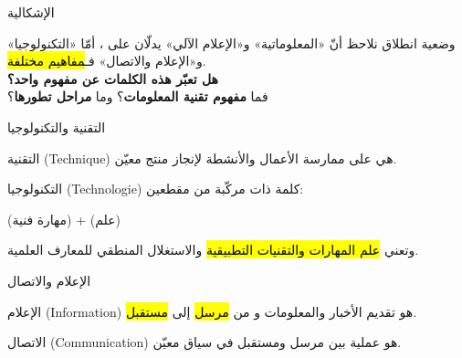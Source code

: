 \documentclass[aspectratio=169, 11pt]{beamer}
\begin{document}
\begin{frame}{الإشكالية}
  \begin{block}{وضعية انطلاق}
    نلاحظ أنّ «المعلوماتية» و«الإعلام الآلي» يدلّان على ،
    أمّا «التكنولوجيا» و«الإعلام والاتصال» فـ\hl{مفاهيم مختلفة}.\\[4pt]
    \textbf{هل تعبّر هذه الكلمات عن مفهوم واحد؟}\\[4pt]
    فما \textbf{مفهوم تقنية المعلومات}؟ وما \textbf{مراحل تطورها}؟
  \end{block}
\end{frame}


\begin{frame}{التقنية والتكنولوجيا}
  \begin{block}{التقنية (Technique)}
    هي  على ممارسة الأعمال والأنشطة لإنجاز منتج معيّن.
  \end{block}
  \begin{block}{التكنولوجيا (Technologie)}
    كلمة ذات  مركّبة من مقطعين:
    \centerline{ (مهارة فنية) \;+\;  (علم)}
    وتعني \hl{علم المهارات والتقنيات التطبيقية} والاستغلال المنطقي للمعارف العلمية.
  \end{block}
\end{frame}

\begin{frame}{الإعلام والاتصال}
  \begin{block}{الإعلام (Information)}
    هو تقديم الأخبار والمعلومات و من \hl{مرسل} إلى \hl{مستقبل}.
  \end{block}
  \begin{block}{الاتصال (Communication)}
    هو عملية  بين مرسل ومستقبل في سياق معيّن.
  \end{block}
  \vspace{4pt}
  \begin{center}
  \end{center}
\end{frame}
\end{document}
